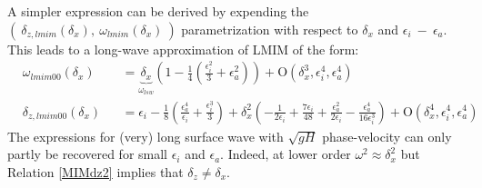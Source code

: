 \documentclass[a4paper,11pt]{article}
\begin{document}
A simpler expression can be derived by expending the $(\ \delta_{z,lmim}(\delta_x),\ \omega_{lmim}(\delta_x)\ )$ parametrization with respect to $\delta_x$ and $\epsilon_i\ -\ \epsilon_a$. This leads to a long-wave approximation of LMIM of the form:
\begin{subequations}
	\begin{alignat}{2}
	\label{MIMomega}
	&\omega_{lmim00}(\delta_x) &&=\underbrace{\delta_x}_{\omega_{lsw}}\left(1-\frac{1}{4}\left(\frac{\epsilon_i^2}{3}+\epsilon_a^2\right)\right)
	 + \mathrm{O}(\delta_x^3,\epsilon_i^4,\epsilon_a^4)\\[3mm]
	\label{MIMdz}
	&\delta_{z,lmim00}(\delta_x) &&=\epsilon_i
	-\frac{1}{8}\left(\frac{\epsilon_a^4}{\epsilon_i}+\frac{\epsilon_i^3}{3}\right)
    +\delta_x^2\left(
    -\frac{1}{2\epsilon_i}+\frac{7\epsilon_i}{48}
    +\frac{\epsilon_a^2}{2\epsilon_i}-\frac{\epsilon_a^4}{16\epsilon_i^3}
    \right)
	 + \mathrm{O}(\delta_x^4,\epsilon_i^4,\epsilon_a^4)
   	\end{alignat}
\end{subequations}
The expressions for (very) long surface wave with $\sqrt{gH}$ phase-velocity can only partly be recovered for small $\epsilon_i$ and $\epsilon_a$. Indeed, at lower order $\omega^2\approx\delta_x^2$ but Relation \ref{MIMdz2} implies that $\delta_z\neq\delta_x$.\\
\end{document}
